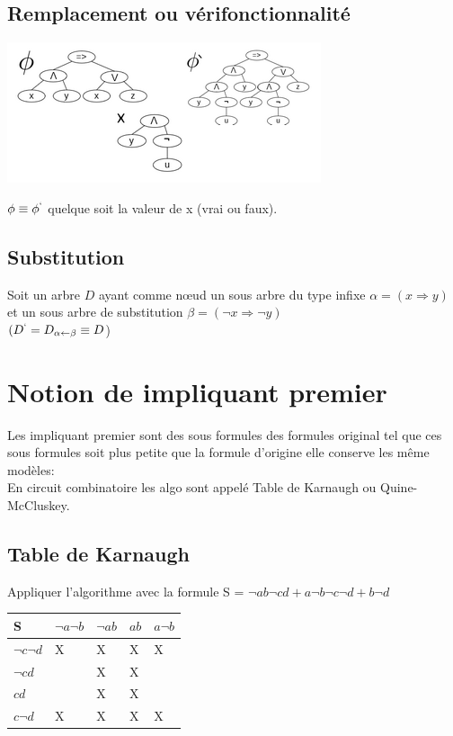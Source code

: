 \subsection{Remplacement ou vérifonctionnalité}
\begin{center}
\includegraphics[scale=0.75]{img/of-remplacement.png} \\
\end{center}

$\phi \equiv \phi^{`}$ quelque soit la valeur de x (vrai ou faux).

\subsection{Substitution}
Soit un arbre $D$ ayant comme nœud un sous arbre du type infixe $\alpha = (x \Rightarrow y)$ et un sous arbre de substitution $\beta = (\neg x \Rightarrow \neg y)$\\
$(D^{`} = D_{\alpha \leftarrow \beta} \equiv D$)\\

\section{Notion de impliquant premier }
Les impliquant premier sont des sous formules des formules original tel que ces sous formules soit plus petite que la formule d'origine elle conserve les même modèles:\\
En circuit combinatoire les algo sont appelé  Table de Karnaugh ou Quine-McCluskey.

\subsection{Table de Karnaugh}
Appliquer l'algorithme avec la formule S = $\neg a b \neg c d + a \neg b \neg c \neg d + b \neg d$\\

\begin{center}
\begin{tabular}{l|l|l|l|l}
  \hline
  S & $\neg a \neg b$ & $\neg a b$ & $ab$ & $a \neg b$\\
  \hline
  $\neg c \neg d$ & X & X & X & X \\
  $ \neg c d $ & $ $ & X & X & $ $ \\
  $cd$ & $ $ & X & X & $ $ \\
  $c \neg d$ & X & X & X & X \\
  \hline
\end{tabular}\\
\end{center}

